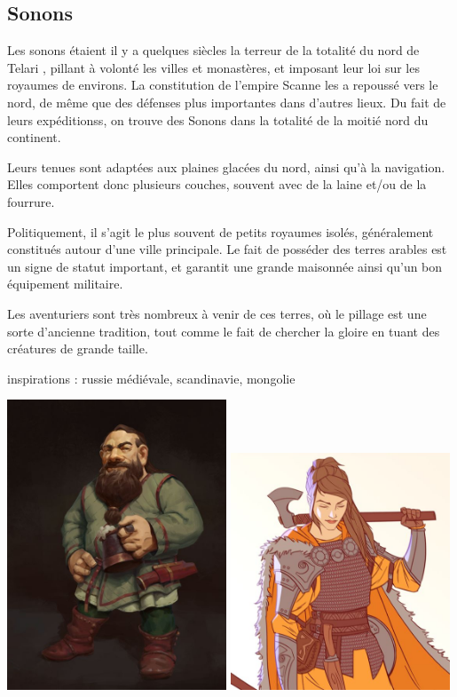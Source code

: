 \documentclass[10pt,a4paper]{book}
\newcommand{\nomorigine}{Telari }
\begin{document}
\subsection{Sonons}
Les sonons étaient il y a quelques siècles la terreur de la totalité du nord de \nomorigine, pillant à volonté les villes et monastères, et imposant leur loi sur les royaumes de environs. La constitution de l'empire Scanne les a repoussé vers le nord, de même que des défenses plus importantes dans d'autres lieux. Du fait de leurs expéditionss, on trouve des Sonons dans la totalité de la moitié nord du continent.

Leurs tenues sont adaptées aux plaines glacées du nord, ainsi qu'à la navigation. Elles comportent donc plusieurs couches, souvent avec de la laine et/ou de la fourrure. 

Politiquement, il s'agit le plus souvent de petits royaumes isolés, généralement constitués autour d'une ville principale. Le fait de posséder des terres arables est un signe de statut important, et garantit une grande maisonnée ainsi qu'un bon équipement militaire.

Les aventuriers sont très nombreux à venir de ces terres, où le pillage est une sorte d'ancienne tradition, tout comme le fait de chercher la gloire en tuant des créatures de grande taille.

inspirations : russie médiévale, scandinavie, mongolie

\includegraphics[width=0.49\textwidth]{nain 2}
\includegraphics[width=0.49\textwidth]{humaine 3}
\end{document}
